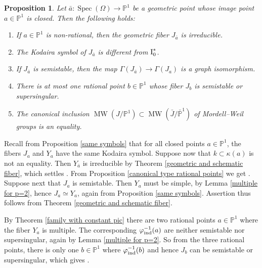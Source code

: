 \documentclass[oneside, 12pt]{amsart}
\newcommand\mylabel[1]{\label{#1}\marginpar{\vspace{-1ex}\medskip\medskip\footnotesize \tt #1}}
\renewcommand\mylabel[1]{\label{#1}}
\newtheorem{proposition}[theorem]{Proposition}
\theoremstyle{definition}
\theoremstyle{remark}
\newcommand{\PP}{\mathbb{P}}
\newcommand{\I}{\text{\rm I}}
\newcommand{\MW}{\operatorname{MW}}
\newcommand{\ra}{\rightarrow}
\newcommand{\Spec}{\operatorname{Spec}}
\newcommand{\ind}{\text{\rm ind}}
\newcommand{\bJ}{{\bar{J}}}
\newcommand{\ba}{{\bar{a}}}
\begin{document}
\begin{proposition}
\mylabel{jacobian fiber properties}
Let $\ba:\Spec(\Omega)\ra \PP^1$ be a geometric point whose image point $a\in \PP^1$ is closed.
Then the following holds:
\begin{enumerate}
\item 
{}
If $a\in \PP^1$ is non-rational, then the geometric fiber $J_\ba$ is irreducible.
\item
{}
The Kodaira symbol of  $J_\ba$ is different from  $\I_0^*$.
\item
{}
If $J_\ba$ is semistable, then  the   map $\Gamma(J_\ba)\ra\Gamma(J_a)$ is a graph isomorphism. 
\item
{}
There is at most one rational point $b\in\PP^1$ whose fiber $J_b$ is semistable or supersingular. 
\item
{}
The canonical inclusion $\MW(J/\PP^1)\subset \MW(\bJ/\bar{\PP}^1)$ 
of Mordell--Weil groups is an equality.
\end{enumerate} 
\end{proposition}

\proof
Recall from Proposition \ref{same symbols} that for all closed points $a\in \PP^1$, the fibers $J_a$ and $Y_a$ have the same Kodaira symbol.
Suppose now that $k\subset\kappa(a)$ is not an equality. Then $Y_\ba$ is   irreducible  
by Theorem \ref{geometric and schematic fiber}, which  settles .
From Proposition \ref{canonical type rational points} we get .
Suppose next  that $J_a$   is semistable. Then $Y_a$ must be simple, by  Lemma \ref{multiple for p=2}, hence
$J_a\simeq Y_a$, again from  Proposition \ref{same symbols}. Assertion  
thus follows from Theorem \ref{geometric and schematic fiber}.

By Theorem \ref{family with constant pic}  there are two rational points $a\in \PP^1$ where the fiber $Y_a$ is multiple.
The corresponding $\varphi^{-1}_\ind(a)$ are neither semistable nor supersingular, again by Lemma \ref{multiple for p=2}.
So from the three rational points, there is only one $b\in\PP^1$  where $\varphi^{-1}_\ind(b)$ and hence $J_b$
can be semistable or supersingular, which gives .
\end{document}
